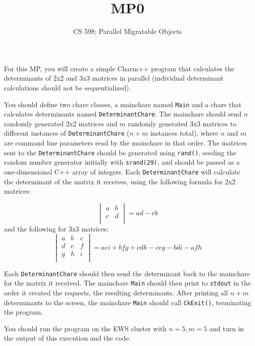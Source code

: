 \documentclass{article}
\title{MP0}
\author{CS 598: Parallel Migratable Objects}
\begin{document}
\maketitle

For this MP, you will create a simple Charm++ program that calculates the
determinants of 2x2 and 3x3 matrices in parallel (individual determinant
calculations should not be sequentialized).

You should define two chare classes, a mainchare named \texttt{Main} and a
chare that calculates determinants named \texttt{DeterminantChare}. The
mainchare should send $n$ randomly generated 2x2 matrices and $m$ randomly
generated 3x3 matrices to different instances of \texttt{DeterminantChare}
($n+m$ instances total), where $n$ and $m$ are command line parameters read by
the mainchare in that order. The matrices sent to the \texttt{DeterminantChare}
should be generated using \texttt{rand()}, seeding the random number generator
initially with \texttt{srand(29)}, and should be passed as a one-dimensional
C++ array of integers. Each \texttt{DeterminantChare} will calculate the
determinant of the matrix it receives, using the following formula for 2x2
matrices:

\[
\begin{vmatrix}
  a & b \\
  c & d \\
\end{vmatrix} = ad - cb
\]%
and the following for 3x3 matrices:
\[
\begin{vmatrix}
  a & b & c \\
  d & e & f \\
  g & h & i \\
\end{vmatrix} = aei+bfg+cdh-ceg-bdi-afh
\]

Each \texttt{DeterminantChare} should then send the determinant back to the
mainchare for the matrix it received. The mainchare \texttt{Main} should then
print to \texttt{stdout} in the order it created the requests, the resulting
determinants. After printing all $n + m$ determinants to the screen, the
mainchare \texttt{Main} should call \texttt{CkExit()}, terminating the program.

You should run the program on the EWS cluster with $n = 5, m = 5$ and turn in
the output of this execution and the code.
\end{document}
